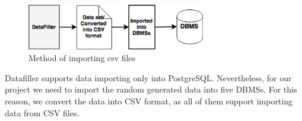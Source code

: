  \begin{figure} 
      \centering
      \includegraphics[width=\textwidth,height=2cm]{Images/Chapter4/4-Datafiller}
      \caption{Method of importing csv files}
      \label{fig:counting-methods}
  \end{figure}  


Datafiller supports data importing only into PostgreSQL. Nevertheless, for our project we need to import the random generated data into five DBMSs. For this reason, we convert the data into CSV format, as all of them support importing data from CSV files.  

